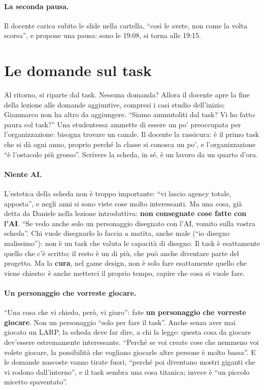 \paragraph{La seconda pausa.} Il docente carica subito le slide nella cartella, ``così
le avete, non come la volta scorsa'', e propone una pausa: sono le 19:08, si torna
alle 19:15.

\section{Le domande sul task}
\label{a4:sec:task-domande}

Al ritorno, si riparte dal task. Nessuna domanda? Allora il docente apre la fine
della lezione alle domande aggiuntive, compresi i casi studio dell'inizio; Gianmarco
non ha altro da aggiungere. ``Siamo ammutoliti dal task? Vi ho fatto paura col
task?'' Una studentessa ammette di essere un po' preoccupata per l'organizzazione:
bisogna trovare un canale. Il docente la rassicura: è il primo task che si dà ogni
anno, proprio perché la classe si conosca un po', e l'organizzazione ``è l'ostacolo
più grosso''. Scrivere la scheda, in sé, è un lavoro da un quarto d'ora.

\paragraph{Niente AI.} L'estetica della scheda non è troppo importante: ``vi lascio
agency totale, apposta'', e negli anni si sono viste cose molto interessanti. Ma una
cosa, già detta da Daniele nella lezione introduttiva: \textbf{non consegnate cose
fatte con l'AI}. ``Se vedo anche solo un personaggio disegnato con l'AI, vomito
sulla vostra scheda''. Chi vuole disegnarlo lo faccia a matita, anche male (``io
disegno malissimo''): non è un task che valuta le capacità di disegno. Il task è
esattamente quello che c'è scritto; il resto è un di più, che può anche diventare
parte del progetto. Ma la \textbf{cura}, nel game design, non è solo fare esattamente
quello che viene chiesto: è anche metterci il proprio tempo, capire che cosa si vuole
fare.

\paragraph{Un personaggio che vorreste giocare.} ``Una cosa che vi chiedo, però, vi
giuro'': fate \textbf{un personaggio che vorreste giocare}. Non un personaggio
``solo per fare il task''. Anche senza aver mai giocato un LARP, la scheda deve far
dire, a chi la legge: questa cosa da giocare dev'essere estremamente interessante.
``Perché se voi create cose che nemmeno voi volete giocare, la possibilità che
vogliano giocarle altre persone è molto bassa''. E le domande nascoste vanno tirate
fuori, ``perché poi diventano mostri giganti che vi rodono dall'interno'', e il task
sembra una cosa titanica; invece è ``un piccolo micetto spaventato''.

